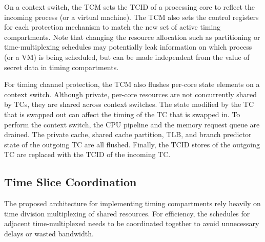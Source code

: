 On a context switch, the TCM sets the TCID of a processing core to reflect
the incoming process (or a virtual machine). The TCM also sets the control
registers for each protection mechanism to match the new set of active
timing compartments. Note that changing the resource allocation such as
partitioning or time-multiplexing schedules may potentially leak information on 
which process (or a VM) is being scheduled, but can be made independent
from the value of secret data in timing compartments.

For timing channel protection, the TCM also flushes per-core state elements
on a context switch.
Although private, per-core resources are not concurrently shared by TCs, they 
are shared across context switches. The state modified by the TC that is 
swapped out can affect the timing of the TC that is swapped in.
To perform the context switch, the CPU pipeline and the memory request queue 
are drained. 
The private cache, shared cache 
partition, TLB, and branch predictor state of the outgoing TC are all flushed.  
Finally, the TCID stores of the outgoing TC are replaced with the TCID of the 
incoming TC. 


\subsection{Time Slice Coordination}
\label{sec:coordination}

The proposed architecture for implementing timing compartments rely heavily on
time division multiplexing of shared resources. For efficiency, the schedules
for adjacent time-multiplexed needs to be coordinated together to avoid 
unnecessary delays or wasted bandwidth.

